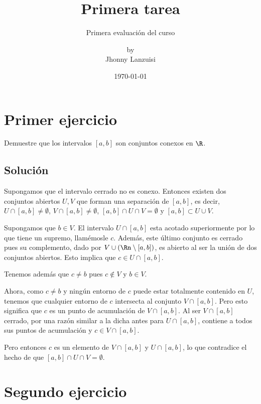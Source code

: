 \documentclass{scrartcl}
\begin{document}
%
\title{Primera tarea}
\subtitle{Primera evaluación del curso}
\subject{Análisis III}
\titlehead{Universidad Simón Bolívar\hfill Caracas, Venezuela}
\author{by \\ Jhonny Lanzuisi}
\date{\today}
\maketitle

\section{Primer ejercicio}

Demuestre que los intervalos \([a,b]\) son conjuntos conexos
en \(\R\).

\subsection{Solución}

Supongamos que el intervalo cerrado no es conexo.
Entonces existen dos conjuntos abiertos \(U,V\) que forman
una separación de \([a,b]\), es decir,
\(U\cap[a,b]\neq\emptyset\), \(V\cap[a,b]\neq\emptyset\),
\([a,b]\cap U\cap V = \emptyset\) y \([a,b]\subset U\cup V\).

Supongamos que \(b\in V\).
El intervalo \(U\cap[a,b]\) esta acotado superiormente
por lo que tiene un supremo, llamémosle \(c\).
Además, este último conjunto es cerrado pues
su complemento, dado por \(V\cup(\Rn\setminus[a,b])\),
es abierto al ser la unión de dos conjuntos abiertos.
Esto implica que \(c \in U\cap[a,b]\).

Tenemos además que \(c\neq b\) pues \(c\not\in V\) y
\(b\in V\).

Ahora, como \(c\neq b\) y ningún entorno de \(c\)
puede estar totalmente contenido en \(U\), tenemos
que cualquier entorno de \(c\) intersecta al conjunto \(V\cap[a,b]\).
Pero esto significa que \(c\) es un punto de acumulación
de \(V\cap[a,b]\). Al ser \(V\cap[a,b]\) cerrado, por una razón
similar a la dicha antes para \(U\cap[a,b]\), contiene a todos
sus puntos de acumulación y \(c \in V\cap[a,b]\).

Pero entonces \(c\) es un elemento de \(V\cap[a,b]\) y \(U\cap[a,b]\),
lo que contradice el hecho de que \([a,b]\cap U\cap V = \emptyset\).
\section{Segundo ejercicio}
\end{document}
